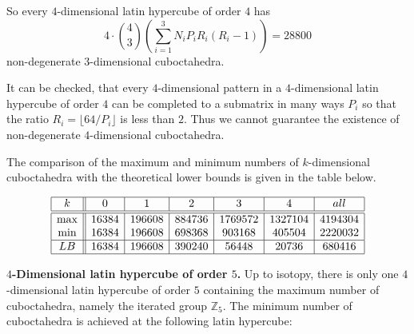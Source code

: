 \documentclass[a4paper]{article}
\begin{document}
So every $4$-dimensional latin hypercube of order $4$ has 
$$  4 \cdot  {4 \choose 3}  \left( \sum\limits_{i=1}^3 N_i P_i R_i(R_i - 1)  \right)   = 28800 $$  
non-degenerate $3$-dimensional cuboctahedra. 

It can be checked, that every $4$-dimensional pattern in a $4$-dimensional latin hypercube of order $4$  can   be completed to a submatrix  in many ways $P_i$ so that   the ratio  $R_i = \lfloor 64  / P_i  \rfloor$  is less than $2$. Thus we cannot guarantee the existence of non-degenerate $4$-dimensional cuboctahedra. 

The comparison of the maximum and minimum numbers of $k$-dimensional  cuboctahedra with the theoretical lower bounds  is given in the table below.

$$
\begin{array}{|c||c|c|c|c|c|c|}
\hline
k & 0 & 1 & 2 & 3 & 4 & all \\
\hline
\hline
\max & 16384 & 196608 & 884736 & 1769572 & 1327104 & 4194304 \\
\min  & 16384 & 196608 & 698368 & 903168  & 405504 & 2220032 \\
\hline
LB  & 16384 & 196608 & 390240 &  56448 & 20736 & 680416 \\
\hline
\end{array}
$$


\textbf{$4$-Dimensional latin hypercube of order $5$.}
Up to isotopy, there is only one $4$-dimensional  latin hypercube of order $5$ containing   the maximum number of cuboctahedra, namely the iterated group $\mathbb{Z}_5$.  The minimum number of cuboctahedra is achieved at the following latin hypercube:
\end{document}
